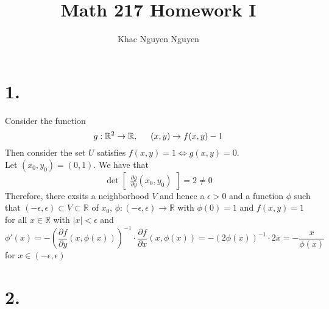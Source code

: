 \documentclass[11pt]{article}
\title{\textbf{Math 217 Homework I}}
\author{Khac Nguyen Nguyen}
\date{}
\begin{document}
\section*{1.}
Consider the function
\[
    g: \mathbb{R}^2 \to \mathbb{R}, \indent (x,y) \to f(x,y)-1
\]
Then consider the set $U$ satisfies $f(x,y) = 1 \iff g(x,y)=0$. \\
Let $(x_0,y_0) = (0,1)$. We have that 
\[
    \det 
    \begin{bmatrix} 
        \frac{\partial g}{\partial y} (x_0,y_0)
    \end{bmatrix} 
    = 2 \ne 0   
\]
Therefore, there exsits a neighborhood $V$ and hence a $\epsilon >0$ and a function $\phi$ such that 
$(-\epsilon, \epsilon) \subset V \subset \mathbb{R}$ of $x_0$, 
$\phi: (-\epsilon, \epsilon) \to \mathbb{R}$ with $\phi(0) = 1$ and $f(x,y) = 1$ for all 
$x\in \mathbb{R}$ with $|x| < \epsilon$ and 
\[
    \phi'(x) = -\left(\frac{\partial f}{\partial y}(x,\phi(x))\right)^{-1} \cdot \frac{\partial f}{\partial x}(x,\phi(x)) = -\left( 2 \phi(x)\right)^{-1} \cdot 2x = -\frac{x}{\phi(x)}    
\]
for $x \in (-\epsilon ,\epsilon )$
\pagebreak
\section*{2.}
\end{document}
